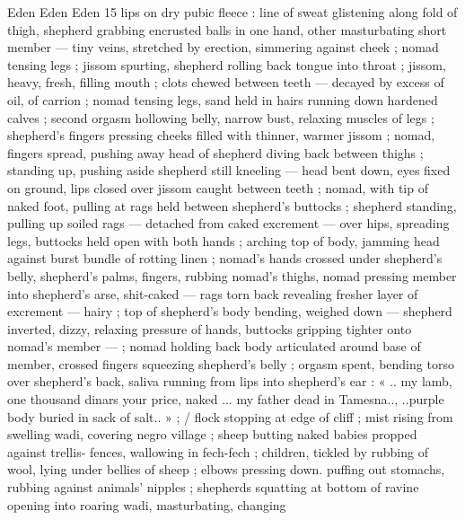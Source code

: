 Eden Eden Eden 15
lips on dry pubic fleece : line of sweat glistening along fold of thigh,
shepherd grabbing encrusted balls in one hand, other masturbating
short member — tiny veins, stretched by erection, simmering
against cheek ; nomad tensing legs ; jissom spurting, shepherd
rolling back tongue into throat ; jissom, heavy, fresh, filling mouth ;
clots chewed between teeth — decayed by excess of oil, of carrion
; nomad tensing legs, sand held in hairs running down hardened
calves ; second orgasm hollowing belly, narrow bust, relaxing
muscles of legs ; shepherd's fingers pressing cheeks filled with
thinner, warmer jissom ; nomad, fingers spread, pushing away head
of shepherd diving back between thighs ; standing up, pushing aside
shepherd still kneeling — head bent down, eyes fixed on ground,
lips closed over jissom caught between teeth ; nomad, with tip of
naked foot, pulling at rags held between shepherd's buttocks ;
shepherd standing, pulling up soiled rags — detached from caked
excrement — over hips, spreading legs, buttocks held open with
both hands ; arching top of body, jamming head against burst bundle
of rotting linen ; nomad's hands crossed under shepherd's belly,
shepherd's palms, fingers, rubbing nomad’s thighs, nomad pressing
member into shepherd's arse, shit-caked — rags torn back revealing
fresher layer of excrement — hairy ; top of shepherd's body
bending, weighed down — shepherd inverted, dizzy, relaxing
pressure of hands, buttocks gripping tighter onto nomad’s member
— ; nomad holding back body articulated around base of member,
crossed fingers squeezing shepherd's belly ; orgasm spent, bending
torso over shepherd's back, saliva running from lips into shepherd's
ear : « .. my lamb, one thousand dinars your price, naked ... my father
dead in Tamesna.., ..purple body buried in sack of salt.. » ; / flock
stopping at edge of cliff ; mist rising from swelling wadi, covering
negro village ; sheep butting naked babies propped against trellis-
fences, wallowing in fech-fech ; children, tickled by rubbing of wool,
lying under bellies of sheep ; elbows pressing down. puffing out
stomachs, rubbing against animals’ nipples ; shepherds squatting at
bottom of ravine opening into roaring wadi, masturbating, changing

